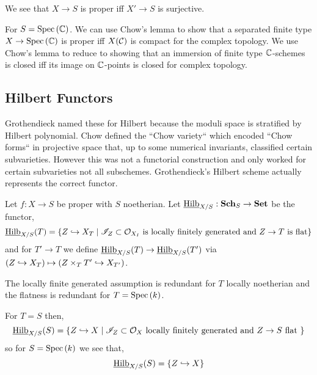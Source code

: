 \documentclass[12pt]{article}
\begin{document}
\begin{rmk}
We see that $X \to S$ is proper iff $X' \to S$ is surjective.
\end{rmk}

\begin{rmk}
For $S = \mathrm{Spec}\left( \mathbb{C} \right)$. We can use Chow's lemma to show that a separated finite type $X \to \mathrm{Spec}\left( \mathbb{C} \right)$ is proper iff $X(\mathcal{C})$ is compact for the complex topology. We use Chow's lemma to reduce to showing that an immersion of finite type $\mathbb{C}$-schemes is closed iff its image on $\mathbb{C}$-points is closed for complex topology.
\end{rmk}


\subsection{Hilbert Functors}

\begin{rmk}
Grothendieck named these for Hilbert because the moduli space is stratified by Hilbert polynomial. Chow defined the ``Chow variety`` which encoded ``Chow forms`` in projective space that, up to some numerical invariants, classified certain subvarieties. However this was not a functorial construction and only worked for certain subvarieties not all subschemes. Grothendieck's Hilbert scheme actually represents the correct functor.
\end{rmk}

\newcommand{\uHilb}{\underline{\Hilb}}
\newcommand{\Set}{\mathbf{Set}}

\begin{defn}
Let $f : X \to S$ be proper with $S$ noetherian. Let $\uHilb_{X/S} : \Sch_S \to \Set$ be the functor,
\[ \uHilb_{X/S}(T) = \{ Z \embed X_T \mid \I_Z \subset \struct{X_I} \text{ is locally finitely generated and } Z \to T \text{ is flat} \} \]
and for $T' \to T$ we define $\uHilb_{X/S}(T) \to \uHilb_{X/S}(T')$ via $(Z \hookrightarrow X_T) \mapsto (Z \times_T T' \hookrightarrow X_{T'})$.
\end{defn}

\begin{rmk}
The locally finite generated assumption is redundant for $T$ locally noetherian and the flatness is redundant for $T = \mathrm{Spec}\left( k \right)$.
\end{rmk}

\begin{example}
For $T = S$ then,
\[ \uHilb_{X/S}(S) = \{ Z \embed X \mid \I_Z \subset \struct{X} \text{ locally finitely generated and } Z \to S \text{ flat } \} \]
so for $S = \mathrm{Spec}\left( k \right)$ we see that,
\[ \uHilb_{X/S}(S) = \{ Z \embed X \} \]
\end{example}
\end{document}
